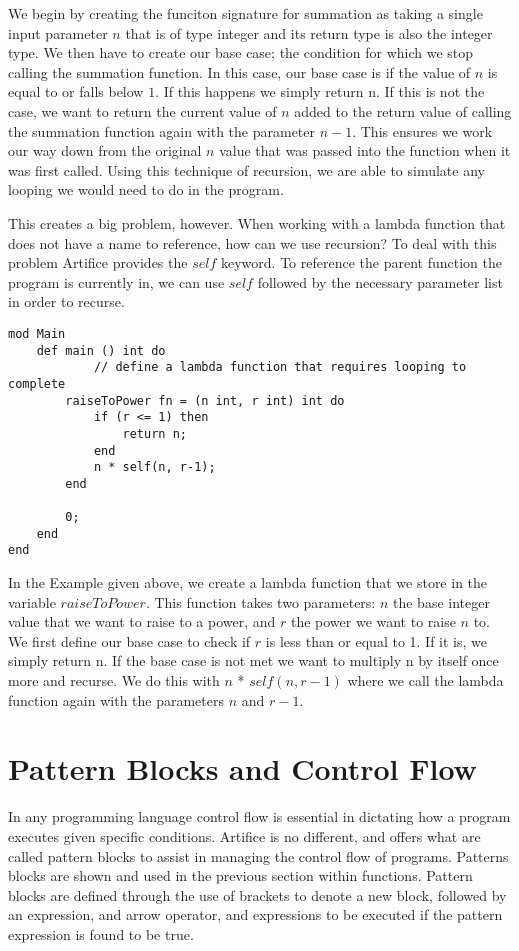 \documentclass{article}
\begin{document}
We begin by creating the funciton signature for summation as taking a single input parameter $n$ that is of type integer and its return type is also the integer type.
We then have to create our base case; the condition for which we stop calling the summation function. In this case, our base case is if the value of $n$ is equal to
or falls below $1$. If this happens we simply return n. If this is not the case, we want to return the current value of $n$ added to the return value of calling the
summation function again with the parameter $n-1$. This ensures we work our way down from the original $n$ value that was passed into the function when it was first
called. Using this technique of recursion, we are able to simulate any looping we would need to do in the program.

This creates a big problem, however. When working with a lambda function that does not have a name to reference, how can we use recursion? To deal with this problem
Artifice provides the $self$ keyword. To reference the parent function the program is currently in, we can use $self$ followed by the necessary parameter list in order
to recurse.

\begin{lstlisting}
mod Main
	def main () int do
			// define a lambda function that requires looping to complete
		raiseToPower fn = (n int, r int) int do
			if (r <= 1) then
				return n;
			end
			n * self(n, r-1);
		end

		0;
	end
end
\end{lstlisting}

In the Example given above, we create a lambda function that we store in the variable $raiseToPower$. This function takes two parameters: $n$ the base integer value
that we want to raise to a power, and $r$ the power we want to raise $n$ to. We first define our base case to check if $r$ is less than or equal to 1. If it is,
we simply return n. If the base case is not met we want to multiply n by itself once more and recurse. We do this with $n$ * $self(n,r-1)$ where we call the
lambda function again with the parameters $n$ and $r-1$.


\section{Pattern Blocks and Control Flow}

In any programming language control flow is essential in dictating how a program executes given specific conditions. Artifice is no different, and offers what are called
pattern blocks to assist in managing the control flow of programs. Patterns blocks are shown and used in the previous section within functions. Pattern blocks are defined
through the use of brackets to denote a new block, followed by an expression, and arrow operator, and expressions to be executed if the pattern expression is found to be true.
\end{document}
